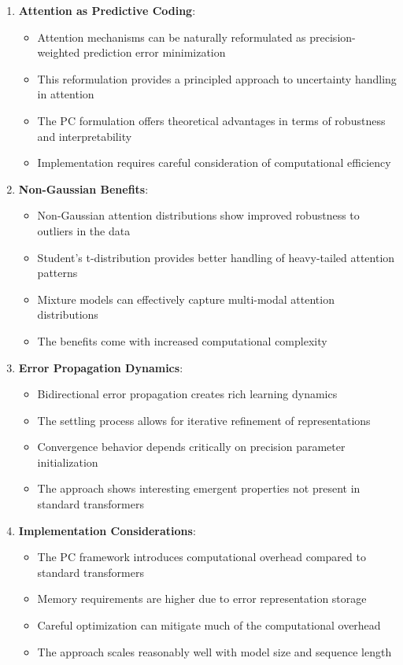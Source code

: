 \documentclass{article}
\begin{document}
\begin{enumerate}
  \item \textbf{Attention as Predictive Coding}:
  \begin{itemize}
    \item Attention mechanisms can be naturally reformulated as precision-weighted prediction error minimization
    \item This reformulation provides a principled approach to uncertainty handling in attention
    \item The PC formulation offers theoretical advantages in terms of robustness and interpretability
    \item Implementation requires careful consideration of computational efficiency
  \end{itemize}

  \item \textbf{Non-Gaussian Benefits}:
  \begin{itemize}
    \item Non-Gaussian attention distributions show improved robustness to outliers in the data
    \item Student's t-distribution provides better handling of heavy-tailed attention patterns
    \item Mixture models can effectively capture multi-modal attention distributions
    \item The benefits come with increased computational complexity
  \end{itemize}

  \item \textbf{Error Propagation Dynamics}:
  \begin{itemize}
    \item Bidirectional error propagation creates rich learning dynamics
    \item The settling process allows for iterative refinement of representations
    \item Convergence behavior depends critically on precision parameter initialization
    \item The approach shows interesting emergent properties not present in standard transformers
  \end{itemize}

  \item \textbf{Implementation Considerations}:
  \begin{itemize}
    \item The PC framework introduces computational overhead compared to standard transformers
    \item Memory requirements are higher due to error representation storage
    \item Careful optimization can mitigate much of the computational overhead
    \item The approach scales reasonably well with model size and sequence length
  \end{itemize}
\end{enumerate}
\end{document}
